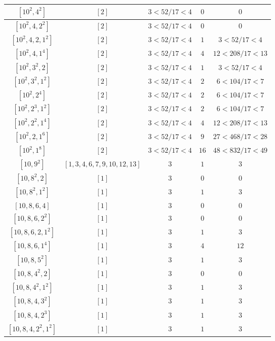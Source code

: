 \documentclass{article}%
\begin{document}
\begin{center}
\begin{longtable}{||c|c|c|c|c||}
$[10^{2}, 4^{2}]$ & $[2]$ & $3 < 52/17 < 4$ & $0$ & $0$ \\ \hline 
$[10^{2}, 4, 2^{2}]$ & $[2]$ & $3 < 52/17 < 4$ & $0$ & $0$ \\ \hline 
$[10^{2}, 4, 2, 1^{2}]$ & $[2]$ & $3 < 52/17 < 4$ & $1$ & $3 < 52/17 < 4$ \\ \hline 
$[10^{2}, 4, 1^{4}]$ & $[2]$ & $3 < 52/17 < 4$ & $4$ & $12 < 208/17 < 13$ \\ \hline 
$[10^{2}, 3^{2}, 2]$ & $[2]$ & $3 < 52/17 < 4$ & $1$ & $3 < 52/17 < 4$ \\ \hline 
$[10^{2}, 3^{2}, 1^{2}]$ & $[2]$ & $3 < 52/17 < 4$ & $2$ & $6 < 104/17 < 7$ \\ \hline 
$[10^{2}, 2^{4}]$ & $[2]$ & $3 < 52/17 < 4$ & $2$ & $6 < 104/17 < 7$ \\ \hline 
$[10^{2}, 2^{3}, 1^{2}]$ & $[2]$ & $3 < 52/17 < 4$ & $2$ & $6 < 104/17 < 7$ \\ \hline 
$[10^{2}, 2^{2}, 1^{4}]$ & $[2]$ & $3 < 52/17 < 4$ & $4$ & $12 < 208/17 < 13$ \\ \hline 
$[10^{2}, 2, 1^{6}]$ & $[2]$ & $3 < 52/17 < 4$ & $9$ & $27 < 468/17 < 28$ \\ \hline 
$[10^{2}, 1^{8}]$ & $[2]$ & $3 < 52/17 < 4$ & $16$ & $48 < 832/17 < 49$ \\ \hline 
$[10, 9^{2}]$ & $[1, 3, 4, 6, 7, 9, 10, 12, 13]$ & $3$ & $1$ & $3$ \\ \hline 
$[10, 8^{2}, 2]$ & $[1]$ & $3$ & $0$ & $0$ \\ \hline 
$[10, 8^{2}, 1^{2}]$ & $[1]$ & $3$ & $1$ & $3$ \\ \hline 
$[10, 8, 6, 4]$ & $[1]$ & $3$ & $0$ & $0$ \\ \hline 
$[10, 8, 6, 2^{2}]$ & $[1]$ & $3$ & $0$ & $0$ \\ \hline 
$[10, 8, 6, 2, 1^{2}]$ & $[1]$ & $3$ & $1$ & $3$ \\ \hline 
$[10, 8, 6, 1^{4}]$ & $[1]$ & $3$ & $4$ & $12$ \\ \hline 
$[10, 8, 5^{2}]$ & $[1]$ & $3$ & $1$ & $3$ \\ \hline 
$[10, 8, 4^{2}, 2]$ & $[1]$ & $3$ & $0$ & $0$ \\ \hline 
$[10, 8, 4^{2}, 1^{2}]$ & $[1]$ & $3$ & $1$ & $3$ \\ \hline 
$[10, 8, 4, 3^{2}]$ & $[1]$ & $3$ & $1$ & $3$ \\ \hline 
$[10, 8, 4, 2^{3}]$ & $[1]$ & $3$ & $1$ & $3$ \\ \hline 
$[10, 8, 4, 2^{2}, 1^{2}]$ & $[1]$ & $3$ & $1$ & $3$ \\ \hline 

\end{longtable}
\end{center}
\end{document}
